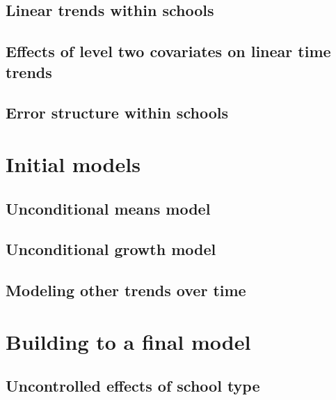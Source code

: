 \documentclass[
]{krantz}
\begin{document}
\hypertarget{lineartwostage}{%
\subsection{Linear trends within schools}\label{lineartwostage}}

\hypertarget{lineartwostageL2effects}{%
\subsection{Effects of level two covariates on linear time trends}\label{lineartwostageL2effects}}

\hypertarget{lineartwostageerror}{%
\subsection{Error structure within schools}\label{lineartwostageerror}}

\hypertarget{lineartwostageerror}{%
\section{Initial models}\label{lineartwostageerror}}

\hypertarget{modela}{%
\subsection{Unconditional means model}\label{modela}}

\hypertarget{modelb}{%
\subsection{Unconditional growth model}\label{modelb}}

\hypertarget{othertimetrends}{%
\subsection{Modeling other trends over time}\label{othertimetrends}}

\hypertarget{finalmodel}{%
\section{Building to a final model}\label{finalmodel}}

\hypertarget{sec:modelc9}{%
\subsection{Uncontrolled effects of school type}\label{sec:modelc9}}
\end{document}

